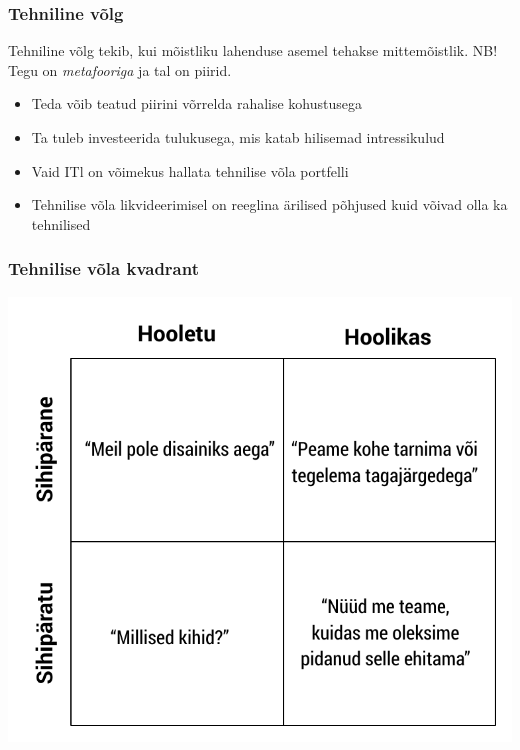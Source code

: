 \begin{frame}[fragile]
  \frametitle{Tehniline võlg}
	Tehniline võlg tekib, kui mõistliku lahenduse asemel tehakse mittemõistlik. NB! Tegu on \emph{metafooriga} ja tal on piirid.
  \begin{itemize}
	\item Teda võib teatud piirini võrrelda rahalise kohustusega
	\item Ta tuleb investeerida tulukusega, mis katab hilisemad intressikulud
	\item Vaid ITl on võimekus hallata tehnilise võla portfelli
	\item Tehnilise võla likvideerimisel on reeglina ärilised põhjused kuid võivad olla ka tehnilised
  \end{itemize}
\end{frame}

\begin{frame}[fragile]
  \frametitle{Tehnilise võla kvadrant}
  	\begin{center}
			\includegraphics[width=.65\textwidth]{fowler.pdf}
	\end{center}
	\cite{fowlerdebt}
\end{frame}

